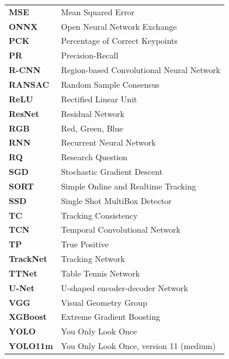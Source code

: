 \begin{longtable}{@{}p{}p{}@{}}
\textbf{MSE}      & Mean Squared Error \\
\textbf{ONNX}     & Open Neural Network Exchange \\
\textbf{PCK}      & Percentage of Correct Keypoints \\
\textbf{PR}       & Precision-Recall \\
\textbf{R-CNN}    & Region-based Convolutional Neural Network \\
\textbf{RANSAC}   & Random Sample Consensus \\
\textbf{ReLU}     & Rectified Linear Unit \\
\textbf{ResNet}   & Residual Network \\
\textbf{RGB}      & Red, Green, Blue \\
\textbf{RNN}      & Recurrent Neural Network \\
\textbf{RQ}       & Research Question \\
\textbf{SGD}      & Stochastic Gradient Descent \\
\textbf{SORT}     & Simple Online and Realtime Tracking \\
\textbf{SSD}      & Single Shot MultiBox Detector \\
\textbf{TC}       & Tracking Consistency \\
\textbf{TCN}      & Temporal Convolutional Network \\
\textbf{TP}       & True Positive \\
\textbf{TrackNet} & Tracking Network \\
\textbf{TTNet}    & Table Tennis Network \\
\textbf{U-Net}    & U-shaped encoder-decoder Network \\
\textbf{VGG}      & Visual Geometry Group \\
\textbf{XGBoost}  & Extreme Gradient Boosting \\
\textbf{YOLO}     & You Only Look Once \\
\textbf{YOLO11m}  & You Only Look Once, version 11 (medium) \\
\end{longtable}
\renewcommand{\arraystretch}{1.0}
\clearpage

